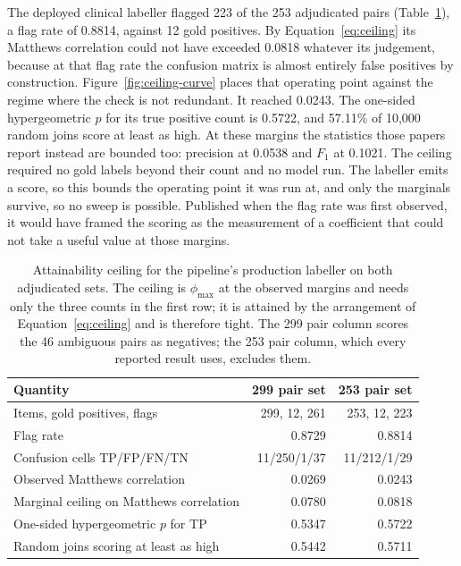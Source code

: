 \documentclass[review]{elsarticle}
\begin{document}
The deployed clinical labeller flagged 223 of the 253
adjudicated pairs (Table~\ref{tab:controls}), a flag rate of 0.8814, against 12
gold positives. By
Equation~\ref{eq:ceiling} its Matthews correlation could not have exceeded 0.0818
whatever its judgement, because at that flag rate the confusion matrix is almost
entirely false positives by construction. Figure~\ref{fig:ceiling-curve} places that operating
point against the regime where the check is not redundant. It
reached 0.0243. The one-sided hypergeometric $p$ for its true positive count is 0.5722, and
57.11\% of 10,000 random joins score at least as high. At these margins the statistics those papers report instead are bounded too:
precision at 0.0538 and $F_1$ at 0.1021. The ceiling required no gold labels beyond their
count and no model run. The labeller emits a score, so this bounds the
operating point it was run at, and only the marginals survive, so no sweep is
possible.
Published when the flag rate was first observed, it would have framed the
scoring as the measurement of a coefficient that could not take a useful value
at those margins.

\begin{table}[!ht]
\centering
\caption{Attainability ceiling for the pipeline's production labeller on both
adjudicated sets. The ceiling is $\phi_{\max}$ at the observed margins
\cite{cureton1959phimax,guilford1965phi} and needs only the three counts in the
first row; it is attained by the arrangement of Equation~\ref{eq:ceiling} and is
therefore tight. The 299 pair column scores the 46 ambiguous pairs as negatives;
the 253 pair column, which every reported result uses, excludes them.}
\label{tab:controls}
\small
\begin{tabular}{lrr}
\hline
Quantity & 299 pair set & 253 pair set \\
\hline
Items, gold positives, flags & 299, 12, 261 & 253, 12, 223 \\
Flag rate & 0.8729 & 0.8814 \\
Confusion cells TP/FP/FN/TN & 11/250/1/37 & 11/212/1/29 \\
Observed Matthews correlation & 0.0269 & 0.0243 \\
Marginal ceiling on Matthews correlation & 0.0780 & 0.0818 \\
One-sided hypergeometric $p$ for TP & 0.5347 & 0.5722 \\
Random joins scoring at least as high & 0.5442 & 0.5711 \\
\hline
\end{tabular}
\end{table}
\end{document}
